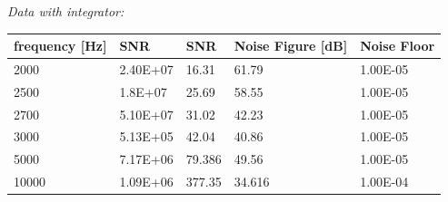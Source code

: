 \textit{Data with integrator:}
\begin{center}
\begin{tabular}{|m{3cm}|m{3cm}|m{1cm}|m{4cm}|m{2cm}|} 
\hline
frequency [Hz]& SNR & SNR & Noise Figure [dB] & Noise Floor \\ 
\hline \hline
2000 & 2.40E+07 & 16.31 & \cellcolor{blue!25}61.79 & 1.00E-05 \\ 
\hline
2500 & 1.8E+07 & 25.69 & \cellcolor{blue!25}58.55 & 1.00E-05 \\ 
\hline
2700 & 5.10E+07 & 31.02 & \cellcolor{blue!25}42.23 & 1.00E-05 \\ 
\hline
3000 & 5.13E+05 & 42.04 & \cellcolor{blue!25}40.86 & 1.00E-05 \\ 
\hline
5000 & 7.17E+06 & 79.386 & \cellcolor{red!25}49.56 & 1.00E-05 \\ 
\hline
10000 & 1.09E+06 & 377.35 & \cellcolor{red!25}34.616 & 1.00E-04 \\ 
\hline

\end{tabular}
\end{center}